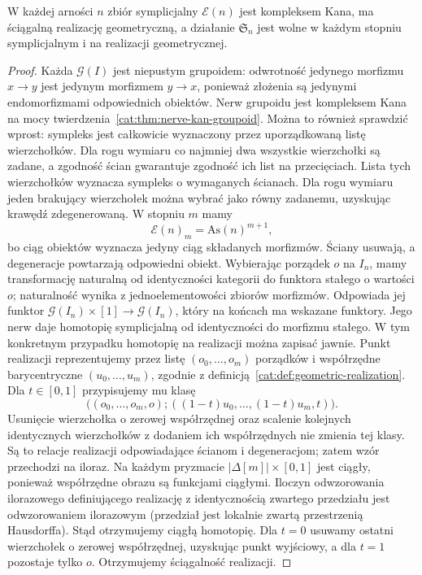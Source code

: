 \begin{stwierdzenie}\label{cat:prop:barratt-eccles}
W każdej arności $n$ zbiór symplicjalny $\mathcal E(n)$ jest kompleksem Kana, ma ściągalną realizację geometryczną, a działanie $\mathfrak S_n$ jest wolne w każdym stopniu symplicjalnym i na realizacji geometrycznej.
\end{stwierdzenie}
\begin{proof}
Każda $\mathcal G(I)$ jest niepustym grupoidem: odwrotność jedynego morfizmu $x\to y$ jest jedynym morfizmem $y\to x$, ponieważ złożenia są jedynymi endomorfizmami odpowiednich obiektów. Nerw grupoidu jest kompleksem Kana na mocy twierdzenia~\ref{cat:thm:nerve-kan-groupoid}. Można to również sprawdzić wprost: sympleks jest całkowicie wyznaczony przez uporządkowaną listę wierzchołków. Dla rogu wymiaru co najmniej dwa wszystkie wierzchołki są zadane, a zgodność ścian gwarantuje zgodność ich list na przecięciach. Lista tych wierzchołków wyznacza sympleks o wymaganych ścianach. Dla rogu wymiaru jeden brakujący wierzchołek można wybrać jako równy zadanemu, uzyskując krawędź zdegenerowaną. W stopniu $m$ mamy
\[
 \mathcal E(n)_m=\mathrm{As}(n)^{m+1},
\]
bo ciąg obiektów wyznacza jedyny ciąg składanych morfizmów. Ściany usuwają, a degeneracje powtarzają odpowiedni obiekt. Wybierając porządek $o$ na $I_n$, mamy transformację naturalną od identyczności kategorii do funktora stałego o wartości $o$; naturalność wynika z jednoelementowości zbiorów morfizmów. Odpowiada jej funktor $\mathcal G(I_n)\times[1]\to\mathcal G(I_n)$, który na końcach ma wskazane funktory. Jego nerw daje homotopię symplicjalną od identyczności do morfizmu stałego. W tym konkretnym przypadku homotopię na realizacji można zapisać jawnie. Punkt realizacji reprezentujemy przez listę $(o_0,\ldots,o_m)$ porządków i współrzędne barycentryczne $(u_0,\ldots,u_m)$, zgodnie z definicją~\ref{cat:def:geometric-realization}. Dla $t\in[0,1]$ przypisujemy mu klasę
\[
 \bigl((o_0,\ldots,o_m,o);
       ((1-t)u_0,\ldots,(1-t)u_m,t)\bigr).
\]
Usunięcie wierzchołka o zerowej współrzędnej oraz scalenie kolejnych identycznych wierzchołków z dodaniem ich współrzędnych nie zmienia tej klasy. Są to relacje realizacji odpowiadające ścianom i degeneracjom; zatem wzór przechodzi na iloraz. Na każdym pryzmacie $|\Delta[m]|\times[0,1]$ jest ciągły, ponieważ współrzędne obrazu są funkcjami ciągłymi. Iloczyn odwzorowania ilorazowego definiującego realizację z identycznością zwartego przedziału jest odwzorowaniem ilorazowym (przedział jest lokalnie zwartą przestrzenią Hausdorffa). Stąd otrzymujemy ciągłą homotopię. Dla $t=0$ usuwamy ostatni wierzchołek o zerowej współrzędnej, uzyskując punkt wyjściowy, a dla $t=1$ pozostaje tylko $o$. Otrzymujemy ściągalność realizacji.


\end{proof}

